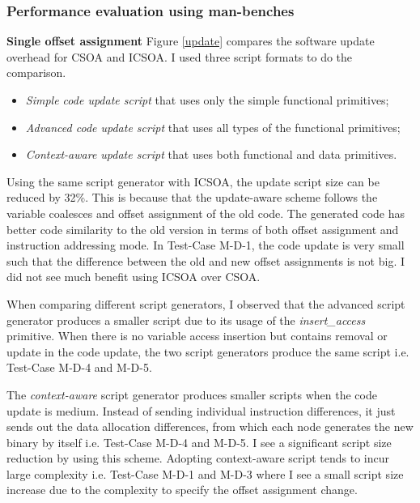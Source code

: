 \subsubsection{Performance evaluation using man-benches}
\textbf{Single offset assignment}
Figure \ref{update} compares the software update overhead for CSOA and ICSOA. I used three script formats to do the comparison.
\begin{itemize}
\itemsep 0pt
\item
{\it Simple code update script} that uses only the simple functional primitives;
\item
{\it Advanced code update script} that uses all types of the functional primitives;
\item
{\it Context-aware update script} that uses both functional and data primitives.
\end{itemize}

Using the same script generator with ICSOA, the update script size can be reduced by 32\%.
This is because that the update-aware scheme follows the variable coalesces and offset assignment of the old code. The generated code has better code similarity to the old version in terms of both offset assignment and instruction addressing mode. In Test-Case M-D-1, the code update is very small such that the difference between the old and new offset assignments is not big. I did not see much benefit using ICSOA over CSOA. 

When comparing different script generators, I observed that  the advanced script generator produces a smaller script due to its usage of the {\it insert\_access} primitive. When there is no variable access insertion but contains removal or update in the code update, the two script generators produce the same script i.e. Test-Case M-D-4 and M-D-5.


The {\em context-aware} script generator produces smaller scripts when the code update is medium. Instead of sending individual instruction differences, it just sends out the data allocation differences, from which each node generates the new binary by itself i.e. Test-Case M-D-4 and M-D-5. I see a significant script size reduction by using this scheme. 
Adopting context-aware script tends to incur large complexity i.e. Test-Case M-D-1 and M-D-3 where I see a small script size increase due to the complexity to specify the offset assignment change. 


